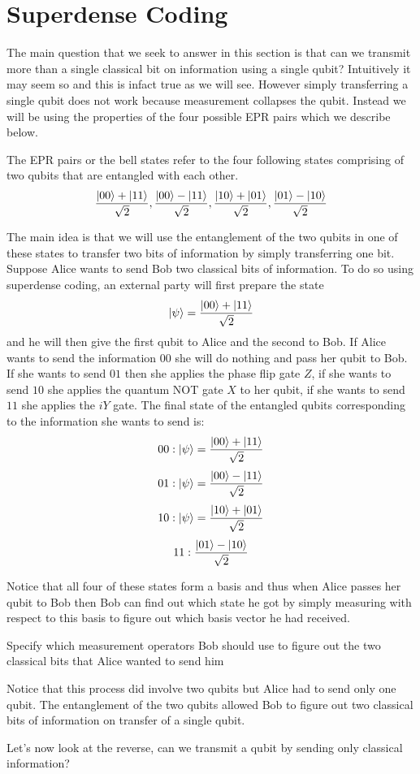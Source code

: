\section{Superdense Coding}
The main question that we seek to answer in this section is that can we transmit more than a single classical bit on information using a single qubit? Intuitively it may seem so and this is infact true as we will see. However simply transferring a single qubit does not work because measurement collapses the qubit. Instead we will be using the properties of the four possible EPR pairs which we describe below.

The EPR pairs or the bell states refer to the four following states comprising of two qubits that are entangled with each other.
$$ \frac{\ket{00} + \ket{11}}{\sqrt{2}}, \frac{\ket{00} - \ket{11}}{\sqrt{2}}, \frac{\ket{10} + \ket{01}}{\sqrt{2}}, \frac{\ket{01} - \ket{10}}{\sqrt{2}}$$

The main idea is that we will use the entanglement of the two qubits in one of these states to transfer two bits of information by simply transferring one bit.
Suppose Alice wants to send Bob two classical bits of information. To do so using superdense coding, an external party will first prepare the state
$$ \ket{\psi} = \frac{\ket{00} + \ket{11}}{\sqrt{2}} $$
and he will then give the first qubit to Alice and the second to Bob.
If Alice wants to send the information $00$ she will do nothing and pass her qubit to Bob.
If she wants to send $01$ then she applies the phase flip gate $Z$, if she wants to send $10$ she applies the quantum NOT gate $X$ to her qubit, if she wants to send $11$ she applies the $iY$ gate. The final state of the entangled qubits corresponding to the information she wants to send is:
$$ 00: \ket{\psi} = \frac{\ket{00} + \ket{11}}{\sqrt{2}}$$
$$ 01: \ket{\psi} = \frac{\ket{00} - \ket{11}}{\sqrt{2}} $$
$$ 10: \ket{\psi} = \frac{\ket{10} + \ket{01}}{\sqrt{2}}$$
$$ 11:  \frac{\ket{01} - \ket{10}}{\sqrt{2}} $$

Notice that all four of these states form a basis and thus when Alice passes her qubit to Bob then Bob can find out which state he got by simply measuring with respect to this basis to figure out which basis vector he had received.

\begin{exercise}
Specify which measurement operators Bob should use to figure out the two classical bits that Alice wanted to send him
\end{exercise}

Notice that this process did involve two qubits but Alice had to send only one qubit. The entanglement of the two qubits allowed Bob to figure out two classical bits of information on transfer of a single qubit.

Let's now look at the reverse, can we transmit a qubit by sending only classical information?
